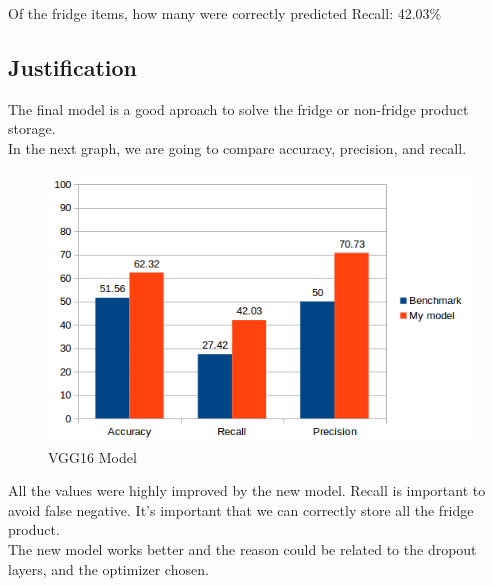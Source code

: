 \documentclass[a4paper,10pt]{article}
\begin{document}
Of the fridge items, how many were correctly predicted
Recall: 42.03\% \\

\noindent{}


\subsection{Justification}


The final model is a good aproach to solve the fridge or non-fridge product storage. \\

In the next graph, we are going to compare accuracy, precision, and recall.\\

\begin{figure}[h]
  \includegraphics[width=\linewidth]{stats1.png}
  \caption{VGG16 Model}
\end{figure}


All the values were highly improved by the new model. Recall is important to avoid false negative. It's important that we can correctly store all the fridge product. \\

The new model works better and the reason could be related to the dropout layers, and the optimizer chosen. \\ 
\end{document}
